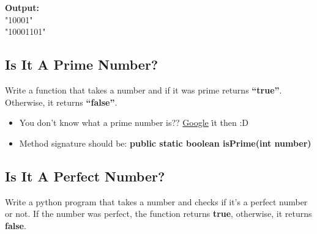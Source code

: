 \documentclass[12pt , a4paper]{article}
\newcommand{\hl}[1]{\colorbox{coolblack}{\color{cream}\textbf{#1}\color{black}}}
\newcommand{\google}{\href{https://www.google.com/}{\color{google_logo_color_blue}G\color{google_logo_color_red}o\color{google_logo_color_yellow}o\color{google_logo_color_blue}g\color{google_logo_color_green}l\color{google_logo_color_red}e\color{black}} \. }
\begin{document}
	\begin{tcolorbox}
	\textbf{Output:}\\
	 "10001" \\
	 "10001101"\\
	\end{tcolorbox}



	\newpage
	\subsection{Is It A Prime Number?}
Write a function that takes a number and if it was prime  returns \hl{“true”}. Otherwise, it returns \hl{“false”}.\\


	\begin{importantBox}

		\begin{itemize}
			\item You don't know what a prime number is?? \google it then :D\\
			\item Method signature should be: \textbf{public static boolean isPrime(int number)}
		\end{itemize}
	\end{importantBox}
	\newpage
	\subsection{Is It A Perfect Number?}
Write a python program that takes a number and checks if it’s a perfect number or not. If the number was perfect, the function returns \hl{true}, otherwise, it returns \hl{false}.
\end{document}
